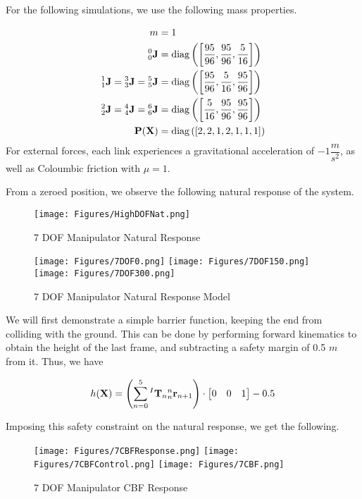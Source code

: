 \noindent For the following simulations, we use the following mass properties.

\begin{align*}
    m &= 1\\
    {^0_0}\mathbf{J} &=  \text{diag}\left (\left [\dfrac{95}{96}, \dfrac{95}{96},  \dfrac{5}{16} \right ] \right )\\
    {^1_1}\mathbf{J} = {^3_3}\mathbf{J} = {^5_5}\mathbf{J} &=  \text{diag}\left (\left [ \dfrac{95}{96}, \dfrac{5}{16}, \dfrac{95}{96} \right ]\right ) \\
    {^2_2}\mathbf{J} = {^4_4}\mathbf{J} = {^6_6}\mathbf{J} &=  \text{diag}\left (\left [ \dfrac{5}{16}, \dfrac{95}{96}, \dfrac{95}{96} \right ]\right ) \\
    \mathbf{P}(\mathbf{X}) &= \text{diag} \left (\left [2, 2, 1, 2, 1, 1, 1 \right] \right )
\end{align*}
\noindent For external forces,  each link experiences a gravitational acceleration of $-1 \dfrac{m}{s^2}$, as well as Coloumbic friction with $\mu = 1$. \newline

\noindent From a zeroed position, we observe the following natural response of the system.

\begin{figure}[H]
    \centering
    \texttt{[image: Figures/HighDOFNat.png]}
    \caption{7 DOF Manipulator Natural Response}
    \label{fig:HighDOFNat}
    \texttt{[image: Figures/7DOF0.png]}
    \texttt{[image: Figures/7DOF150.png]}
    \texttt{[image: Figures/7DOF300.png]}
    \caption{7 DOF Manipulator Natural Response Model}
\end{figure}

\noindent We will first demonstrate a simple barrier function, keeping the end from colliding with the ground. This can be done by performing forward kinematics to obtain the height of the last frame, and subtracting a safety margin of 0.5 $m$ from it. Thus, we have

\begin{align}
    h(\mathbf{X}) = \left (\sum_{n=0}^5 {^I\mathbf{T}_n}{^n_n\mathbf{r}_{n+1}} \right) \cdot \begin{bmatrix} 0 & 0 & 1\end{bmatrix} - 0.5
\end{align}

\noindent Imposing this safety constraint on the natural response, we get the following.

\begin{figure}[H]
    \centering
    \texttt{[image: Figures/7CBFResponse.png]}
    \texttt{[image: Figures/7CBFControl.png]}
    \texttt{[image: Figures/7CBF.png]}
    \caption{7 DOF Manipulator CBF Response}
    \label{fig:7DOFCBFResponse1}
\end{figure}

